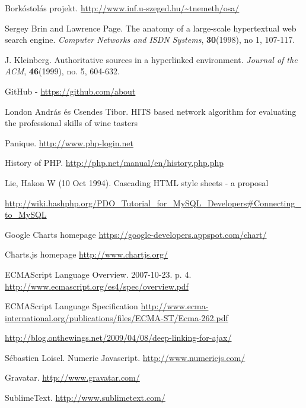 \documentclass[12pt]{report}
\theoremstyle{definition}
\begin{document}
	\begin{thebibliography}{99}
		Borkóstolás projekt.  \url{http://www.inf.u-szeged.hu/~tnemeth/osa/}
		
		Sergey Brin and Lawrence Page. 
		The anatomy of a large-scale hypertextual web search engine. 
		\emph{ Computer Networks and ISDN Systems},
		\textbf{30}(1998), no 1, 107-117.
		
		J. Kleinberg. Authoritative sources in a hyperlinked environment.
		\emph{Journal of the ACM}, \textbf{46}(1999), no. 5, 604-632.
		
		GitHub - \url{https://github.com/about}
		
		London András és Csendes Tibor. 
		HITS based network algorithm for evaluating the professional skills of wine tasters
		
		Panique. \url{http://www.php-login.net}
		
		History of PHP. \url{http://php.net/manual/en/history.php.php}
		
		Lie, Hakon W (10 Oct 1994). Cascading HTML style sheets - a proposal
		
		\url{http://wiki.hashphp.org/PDO\_Tutorial\_for\_MySQL\_Developers\#Connecting\_to\_MySQL}
		
		Google Charts homepage
		\url{https://google-developers.appspot.com/chart/}
		
		Charts.js homepage
		\url{http://www.chartjs.org/}
		
		ECMAScript Language Overview. 2007-10-23. p. 4. \url{http://www.ecmascript.org/es4/spec/overview.pdf}
		
		ECMAScript Language Specification \url{http://www.ecma-international.org/publications/files/ECMA-ST/Ecma-262.pdf}
		
		\url{http://blog.onthewings.net/2009/04/08/deep-linking-for-ajax/}
		
		Sébastien Loisel.
		Numeric Javascript. 
		\url{http://www.numericjs.com/}
		
		Gravatar.
		\url{http://www.gravatar.com/}
		
		SublimeText.
		\url{http://www.sublimetext.com/}
		

\end{thebibliography}
\end{document}
